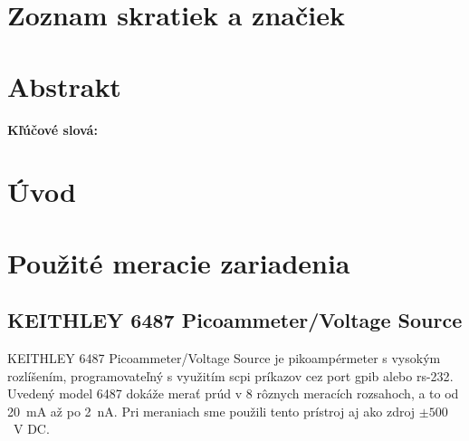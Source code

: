 \documentclass[12pt,a4paper]{article}
\begin{document}
\section*{Zoznam skratiek a značiek}
\printacronyms[%
  heading=none, %
  sort=true     %
]
\newpage

\section{Abstrakt}

\vspace{1cm}
\noindent\textbf{Kľúčové slová:} %
\newpage
\section{Úvod}

\newpage
\section{Použité meracie zariadenia}
\subsection{KEITHLEY 6487 Picoammeter/Voltage Source}
KEITHLEY 6487 Picoammeter/Voltage Source je pikoampérmeter s vysokým rozlíšením,
programovateľný s využitím \ac{scpi} príkazov cez port \ac{gpib} alebo \ac{rs-232}. Uvedený model 6487 dokáže merať prúd v 8 rôznych meracích rozsahoch, a to od 20~mA až po 2~nA. Pri meraniach sme použili tento prístroj aj ako zdroj $\pm 500$~V DC.
\end{document}
